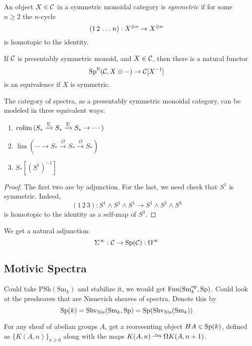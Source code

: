 \documentclass[12pt]{article}
\begin{document}
\begin{defn}
An object $X \in \mathcal{C}$ in a symmetric monoidal category is \textit{symmetric} if for some $n \ge 2$ the $n$-cycle 
\[ (1 \, 2 \, \dots \, n) : X^{\otimes n} \to X^{\otimes n} \]
is homotopic to the identity. 
\end{defn}

\begin{theorem}
If $\mathcal{C}$ is presentably symmetric monoid, and $X \in \mathcal{C}$, then there is a natural functor
\[ \mathrm{Sp}^{\mathbb{N}}(\mathcal{C}, X \otimes -) \to \mathcal{C}[X^{-1}] \]
is an equivalence if $X$ is symmetric. 
\end{theorem}

\begin{cor}
The category of spectra, as a presentably symmetric monoidal category, can be modeled in three equivalent ways:
\begin{enumerate}
\item $\operatorname*{\mathrm{colim}}{(S_* \xrightarrow{\Sigma} S_* \xrightarrow{\Sigma} S_* \to \cdots)}$
\item $\lim{(\cdots \to S_* \xrightarrow{\Omega} S_* \xrightarrow{\Omega} S_*)}$
\item $S_*[(S^1)^{-1}]$ 
\end{enumerate}
\end{cor}

\begin{proof}
The first two are by adjunction. For the last, we need check that $S^1$ is symmetric. Indeed,
\[ (1 \, 2 \, 3) : S^1 \wedge S^1 \wedge S^1 \to S^1 \wedge S^1 \wedge S^3 \]
is homotopic to the identity as a self-map of $S^3$. 
\end{proof}

We get a natural adjunction:
\[ \Sigma^{\infty} : \mathcal{C} \to \mathrm{Sp}(\mathcal{C}) : \Omega^\infty \]


\subsection{Motivic Spectra}

\newcommand{\PSh}{\mathrm{PSh}}
\newcommand{\Sm}{\mathrm{Sm}}
\newcommand{\Fun}{\mathrm{Fun}}
\newcommand{\Nis}{\mathrm{Nis}}

Could take $\PSh(\Sm_k)$ and stabilize it, we would get $\Fun(\Sm_k^{\op}, \Sp)$. Could look at the presheaves that are Nisnevich sheaves of spectra. Denote this by
\[ \Sp(k) = \Shv_{\Nis}(\Sm_k, \Sp) = \Sp(\Shv_{\Nis}(\Sm_k)) \]

\begin{example}
For any sheaf of abelian groups $A$, get a reoresenting object $H A \in \mathrm{Sp}(k)$, defined as $\{ K(A, n) \}_{n \ge 0}$ along with the maps $K(A, n) \iso \Omega K(A, n+1)$. 
\end{example}
\end{document}
